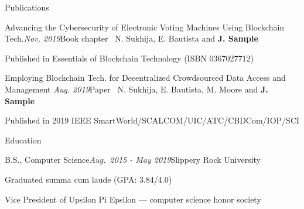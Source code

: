 \documentclass{resume} %
\begin{document}
\begin{rSection}{Publications}
\begin{rSubsection}{\small{Advancing the Cybersecurity of Electronic Voting Machines Using Blockchain Tech.}}{\em Nov. 2019}{Book chapter \textbar \ N. Sukhija, E. Bautista and \textbf{J. Sample}}{}
\item Published in Essentials of Blockchain Technology (ISBN 0367027712)
\end{rSubsection}

\begin{rSubsection}{\footnotesize{Employing Blockchain Tech. for Decentralized Crowdsourced Data Access and Management}
}{\em Aug. 2019}{Paper \textbar \ N. Sukhija, E. Bautista, M. Moore and \textbf{J. Sample}}{}
\item Published in 2019 IEEE SmartWorld/SCALCOM/UIC/ATC/CBDCom/IOP/SCI
\end{rSubsection}
\end{rSection}


\begin{rSection}{Education}

\begin{rSubsection}{B.S., Computer Science}{\em Aug.\ 2015 - May 2019}{Slippery Rock University}{}
\item Graduated summa cum laude (GPA: 3.84/4.0)
\item Vice President of Upsilon Pi Epsilon — computer science honor society
\end{rSubsection}

\end{rSection}




\end{document}
